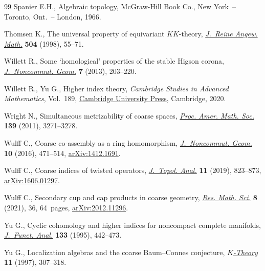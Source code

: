 \documentclass[pdftex]{sigma}
\numberwithin{equation}{section}
\theoremstyle{definition}
\begin{document}
\begin{thebibliography}{99}
Spanier E.H., Algebraic topology, McGraw-Hill Book Co., New York~-- Toronto,
 Ont.~-- London, 1966.

Thomsen K., The universal property of equivariant {$KK$}-theory,
 \href{https://doi.org/10.1515/crll.1998.112}{\textit{J.~Reine Angew. Math.}} \textbf{504} (1998), 55--71.

Willett R., Some `homological' properties of the stable {H}igson corona,
 \href{https://doi.org/10.4171/JNCG/114}{\textit{J.~Noncommut. Geom.}} \textbf{7} (2013), 203--220.

Willett R., Yu G., Higher index theory, \textit{Cambridge Studies in Advanced
 Mathematics}, Vol.~189, \href{https://doi.org/10.1017/9781108867351}{Cambridge University Press}, Cambridge, 2020.

Wright N., Simultaneous metrizability of coarse spaces, \href{https://doi.org/10.1090/S0002-9939-2011-10805-0}{\textit{Proc. Amer.
 Math. Soc.}} \textbf{139} (2011), 3271--3278.

Wulff C., Coarse co-assembly as a ring homomorphism, \href{https://doi.org/10.4171/JNCG/240}{\textit{J.~Noncommut.
 Geom.}} \textbf{10} (2016), 471--514, \href{https://arxiv.org/abs/1412.1691}{arXiv:1412.1691}.

Wulff C., Coarse indices of twisted operators, \href{https://doi.org/10.1142/s179352531950033x}{\textit{J.~Topol. Anal.}}
 \textbf{11} (2019), 823--873, \href{https://arxiv.org/abs/1606.01297}{arXiv:1606.01297}.

Wulff C., Secondary cup and cap products in coarse geometry, \href{https://doi.org/10.1007/s40687-021-00273-4}{\textit{Res. Math.
 Sci.}} \textbf{8} (2021), 36, 64~pages, \href{https://arxiv.org/abs/2012.11296}{arXiv:2012.11296}.

Yu G., Cyclic cohomology and higher indices for noncompact complete manifolds,
 \href{https://doi.org/10.1006/jfan.1995.1133}{\textit{J.~Funct. Anal.}} \textbf{133} (1995), 442--473.

Yu G., Localization algebras and the coarse {B}aum--{C}onnes conjecture,
 \href{https://doi.org/10.1023/a:1007766031161}{\textit{$K$-Theory}} \textbf{11} (1997), 307--318.

\end{thebibliography}\LastPageEnding
\end{document}
